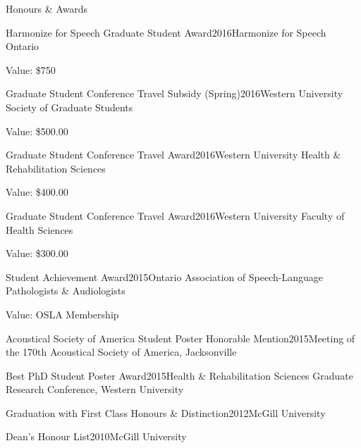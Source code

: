 \documentclass{resume} %
\begin{document}
\begin{rSection}{Honours \& Awards}
\begin{rSubsection}{Harmonize for Speech Graduate Student Award}{2016}{Harmonize for Speech Ontario}{}
\item Value: \$750
\end{rSubsection}

\begin{rSubsection}{Graduate Student Conference Travel Subsidy (Spring)}{2016}{Western University Society of Graduate Students}{}
\item Value: \$500.00
\end{rSubsection}

\begin{rSubsection}{Graduate Student Conference Travel Award}{2016}{Western University Health \& Rehabilitation Sciences}{}
\item Value: \$400.00
\end{rSubsection}

\begin{rSubsection}{Graduate Student Conference Travel Award}{2016}{Western University Faculty of Health Sciences}{}
\item Value: \$300.00
\end{rSubsection}

\begin{rSubsection}{Student Achievement Award}{2015}{Ontario Association of Speech-Language Pathologists \&
Audiologists}{}
\item Value: OSLA Membership
\end{rSubsection}

\begin{rSubsection}{Acoustical Society of America Student Poster Honorable Mention}{2015}{Meeting of the 170th Acoustical Society of America, Jacksonville}{}
\end{rSubsection}

\begin{rSubsection}{Best PhD Student Poster Award}{2015}{Health \& Rehabilitation Sciences Graduate Research Conference, Western University}{}
\end{rSubsection}


\begin{rSubsection}{Graduation with First Class Honours \& Distinction}{2012}{McGill University}{ }
\end{rSubsection}

\begin{rSubsection}{Dean's Honour List}{2010}{McGill University}{}
\end{rSubsection}


\end{rSection}
\end{document}
